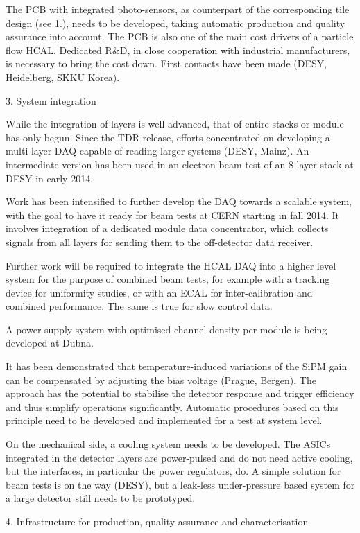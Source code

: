 The PCB with integrated photo-sensors, as counterpart of the corresponding tile design (see 1.), needs to be developed, taking automatic production and quality assurance into account. The PCB is also one of the main cost drivers of a particle flow HCAL. Dedicated R\&D, in close cooperation with industrial manufacturers, is necessary to bring the cost down. First contacts have been made (DESY, Heidelberg, SKKU Korea).  

3.  System integration

While the integration of layers is well advanced, that of entire stacks or module has only begun. Since the TDR release, efforts concentrated on developing a multi-layer DAQ capable of reading larger systems (DESY, Mainz). An intermediate version has been used in an electron beam test of an 8 layer stack at DESY in early 2014. 

Work has been intensified to further develop the DAQ towards a scalable system, with the goal to have it ready for beam tests at CERN starting in fall 2014. It involves integration of a dedicated module data concentrator, which collects signals from all layers for sending them to the off-detector data receiver. 

Further work will be required to integrate the HCAL DAQ into a higher level system for the purpose of combined beam tests, for example with a tracking device for uniformity studies, or with an ECAL for inter-calibration and combined performance. The same is true for slow control data.

A power supply system with optimised channel density per module is being developed at Dubna.

It has been demonstrated that temperature-induced variations of the SiPM gain can be compensated by adjusting the bias voltage (Prague, Bergen). The approach has the potential to stabilise the detector response and trigger efficiency and thus simplify operations significantly. Automatic procedures based on this principle need to be developed and implemented for a test at system level. 

On the mechanical side, a cooling system needs to be developed. The ASICs integrated in the detector layers are power-pulsed and do not need active cooling, but the interfaces, in particular the power regulators, do. A simple solution for beam tests is on the way (DESY), but a leak-less under-pressure based system for a large detector still needs to be prototyped. 

4.  Infrastructure for production, quality assurance and characterisation

